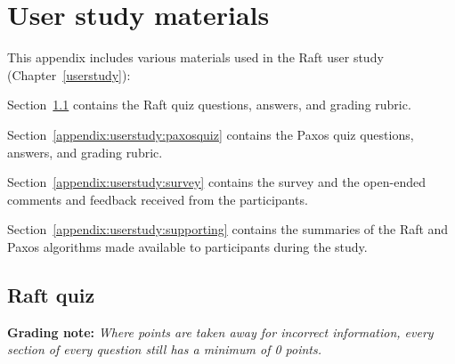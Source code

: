 \newcommand\note[2]{\textbf{#1: }\emph{#2}}
\newcommand\answer[1]{\note{Answer}{#1}}
\newcommand\grading[1]{\note{Grading}{#1}}
\newcommand\responses[1]{\note{Responses}{#1}}

\chapter{User study materials}
\label{appendix:userstudy}

This appendix includes various materials used in the Raft user study
(Chapter~\ref{userstudy}):
\begin{compactitem}
\item Section~\ref{appendix:userstudy:raftquiz} contains the Raft quiz
questions, answers, and grading rubric.
\item Section~\ref{appendix:userstudy:paxosquiz} contains the Paxos quiz
questions, answers, and grading rubric.
\item Section~\ref{appendix:userstudy:survey} contains the survey
and the open-ended comments and feedback received from the participants.
\item Section~\ref{appendix:userstudy:supporting} contains the summaries of
the Raft and Paxos algorithms made available to participants during the study.
\end{compactitem}

\section{Raft quiz}
\label{appendix:userstudy:raftquiz}

\note{Grading note}{Where points are taken away for incorrect
information, every section of every question still has a minimum of 0
points.}

